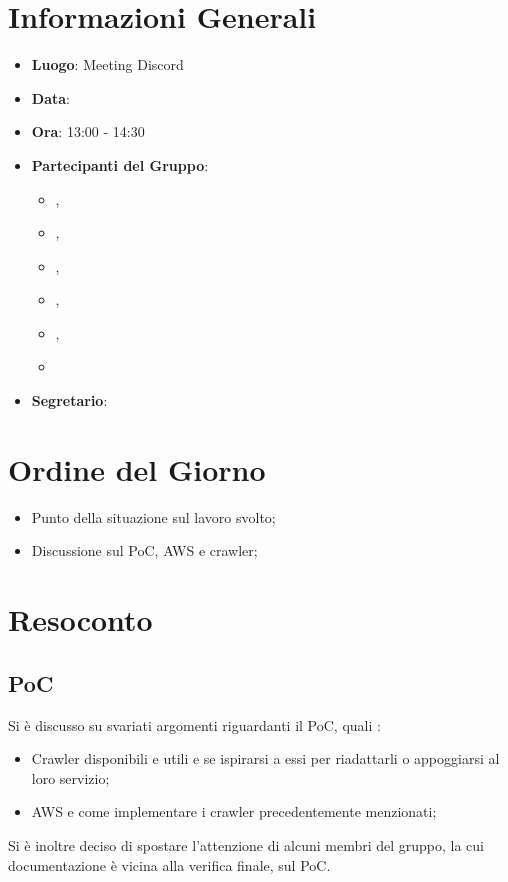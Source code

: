 \section{Informazioni Generali}

\begin{itemize}
\item{\textbf{Luogo}}: Meeting Discord
\item{\textbf{Data}}: \D{}
\item{\textbf{Ora}}: 13:00 - 14:30
\item{\textbf{Partecipanti del Gruppo}}: 
	\begin{itemize}
	\item{\EP{},} 
	\item{\FP{},}
	\item{\GC{},}
	\item{\MB{},}
	\item{\MG{},}
	\item{\PV{}}
	\end{itemize} 
\item{\textbf{Segretario}}: \PV{}	
\end{itemize}

\section{Ordine del Giorno}
\begin{itemize}
\item{Punto della situazione sul lavoro svolto;}
\item{Discussione sul PoC, AWS e crawler;}


\end{itemize}

\section{Resoconto}

\subsection{PoC}
Si è discusso su svariati argomenti riguardanti il PoC, quali :  
\begin{itemize}
    \item Crawler disponibili e utili e se ispirarsi a essi per riadattarli o appoggiarsi al loro servizio;
    \item AWS e come implementare i crawler precedentemente menzionati;
\end{itemize}
Si è inoltre deciso di spostare l'attenzione di alcuni membri del gruppo, la cui documentazione è vicina alla verifica finale, sul PoC.

